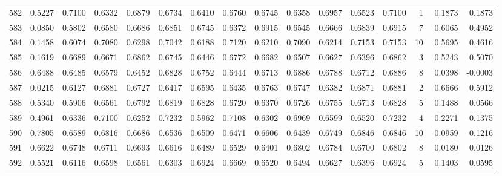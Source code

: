 \begin{tabular}{lrrrrrrrrrrrrrrr}
582 &      0.5227 &  0.7100 &  0.6332 &  0.6879 &  0.6734 &  0.6410 &  0.6760 &  0.6745 &  0.6358 &  0.6957 &   0.6523 &     0.7100 &      1 &                    0.1873 &                     0.1873 \\
583 &      0.0850 &  0.5802 &  0.6580 &  0.6686 &  0.6851 &  0.6745 &  0.6372 &  0.6915 &  0.6545 &  0.6666 &   0.6839 &     0.6915 &      7 &                    0.6065 &                     0.4952 \\
584 &      0.1458 &  0.6074 &  0.7080 &  0.6298 &  0.7042 &  0.6188 &  0.7120 &  0.6210 &  0.7090 &  0.6214 &   0.7153 &     0.7153 &     10 &                    0.5695 &                     0.4616 \\
585 &      0.1619 &  0.6689 &  0.6671 &  0.6862 &  0.6745 &  0.6446 &  0.6772 &  0.6682 &  0.6507 &  0.6627 &   0.6396 &     0.6862 &      3 &                    0.5243 &                     0.5070 \\
586 &      0.6488 &  0.6485 &  0.6579 &  0.6452 &  0.6828 &  0.6752 &  0.6444 &  0.6713 &  0.6886 &  0.6788 &   0.6712 &     0.6886 &      8 &                    0.0398 &                    -0.0003 \\
587 &      0.0215 &  0.6127 &  0.6881 &  0.6727 &  0.6417 &  0.6595 &  0.6435 &  0.6763 &  0.6747 &  0.6382 &   0.6871 &     0.6881 &      2 &                    0.6666 &                     0.5912 \\
588 &      0.5340 &  0.5906 &  0.6561 &  0.6792 &  0.6819 &  0.6828 &  0.6720 &  0.6370 &  0.6726 &  0.6755 &   0.6713 &     0.6828 &      5 &                    0.1488 &                     0.0566 \\
589 &      0.4961 &  0.6336 &  0.7100 &  0.6252 &  0.7232 &  0.5962 &  0.7108 &  0.6302 &  0.6969 &  0.6599 &   0.6520 &     0.7232 &      4 &                    0.2271 &                     0.1375 \\
590 &      0.7805 &  0.6589 &  0.6816 &  0.6686 &  0.6536 &  0.6509 &  0.6471 &  0.6606 &  0.6439 &  0.6749 &   0.6846 &     0.6846 &     10 &                   -0.0959 &                    -0.1216 \\
591 &      0.6622 &  0.6748 &  0.6711 &  0.6693 &  0.6616 &  0.6489 &  0.6529 &  0.6401 &  0.6802 &  0.6784 &   0.6700 &     0.6802 &      8 &                    0.0180 &                     0.0126 \\
592 &      0.5521 &  0.6116 &  0.6598 &  0.6561 &  0.6303 &  0.6924 &  0.6669 &  0.6520 &  0.6494 &  0.6627 &   0.6396 &     0.6924 &      5 &                    0.1403 &                     0.0595 \\

\end{tabular}
